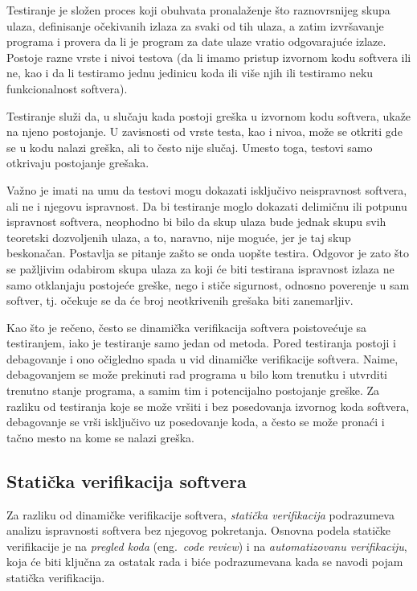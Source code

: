 \documentclass[a4paper]{article}
\theoremstyle{definition}
\begin{document}
{\par Testiranje je složen proces koji obuhvata pronalaženje što raznovrsnijeg skupa ulaza, definisanje očekivanih izlaza za svaki od tih ulaza, a zatim izvršavanje programa i provera da li je program za date ulaze vratio odgovarajuće izlaze. Postoje razne vrste i nivoi testova (da li imamo pristup izvornom kodu softvera ili ne, kao i da li testiramo jednu jedinicu koda ili više njih ili testiramo neku funkcionalnost softvera).

\par Testiranje služi da, u slučaju kada postoji greška u izvornom kodu softvera, ukaže na njeno postojanje. U zavisnosti od vrste testa, kao i nivoa, može se otkriti gde se u kodu nalazi greška, ali to često nije slučaj. Umesto toga, testovi samo otkrivaju postojanje grešaka.

\par Važno je imati na umu da testovi mogu dokazati isključivo neispravnost softvera, ali ne i njegovu ispravnost. Da bi testiranje moglo dokazati delimičnu ili potpunu ispravnost softvera, neophodno bi bilo da skup ulaza bude jednak skupu svih teoretski dozvoljenih ulaza, a to, naravno, nije moguće, jer je taj skup beskonačan. Postavlja se pitanje zašto se onda uopšte testira. Odgovor je zato što se pažljivim odabirom skupa ulaza za koji će biti testirana ispravnost izlaza ne samo otklanjaju postojeće greške, nego i stiče sigurnost, odnosno poverenje u sam softver, tj. očekuje se da će broj neotkrivenih grešaka biti zanemarljiv.

\par Kao što je rečeno, često se dinamička verifikacija softvera poistovećuje sa testiranjem, iako je testiranje samo jedan od metoda. Pored testiranja postoji i debagovanje i ono očigledno spada u vid dinamičke verifikacije softvera. Naime, debagovanjem se može prekinuti rad programa u bilo kom trenutku i utvrditi trenutno stanje programa, a samim tim i potencijalno postojanje greške. Za razliku od testiranja koje se može vršiti i bez posedovanja izvornog koda softvera, debagovanje se vrši isključivo uz posedovanje koda, a često se može pronaći i tačno mesto na kome se nalazi greška.

\subsection{Statička verifikacija softvera}
\label{subsec:staticka}

\par Za razliku od dinamičke verifikacije softvera, \textit{statička verifikacija} podrazumeva analizu ispravnosti softvera bez njegovog pokretanja. Osnovna podela statičke verifikacije je na \textit{pregled koda} (eng.~{\em code review}) i na \textit{automatizovanu verifikaciju}, koja će biti ključna za ostatak rada i biće podrazumevana kada se navodi pojam statička verifikacija.

}
\end{document}
